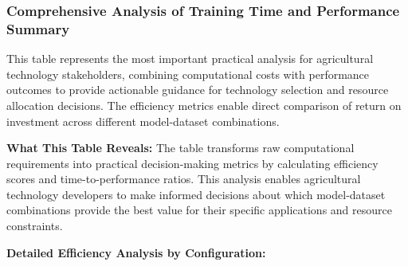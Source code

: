 \subsubsection{Comprehensive Analysis of Training Time and Performance Summary}

This table represents the most important practical analysis for agricultural technology stakeholders, combining computational costs with performance outcomes to provide actionable guidance for technology selection and resource allocation decisions. The efficiency metrics enable direct comparison of return on investment across different model-dataset combinations.

\textbf{What This Table Reveals:} The table transforms raw computational requirements into practical decision-making metrics by calculating efficiency scores and time-to-performance ratios. This analysis enables agricultural technology developers to make informed decisions about which model-dataset combinations provide the best value for their specific applications and resource constraints.

\textbf{Detailed Efficiency Analysis by Configuration:}

